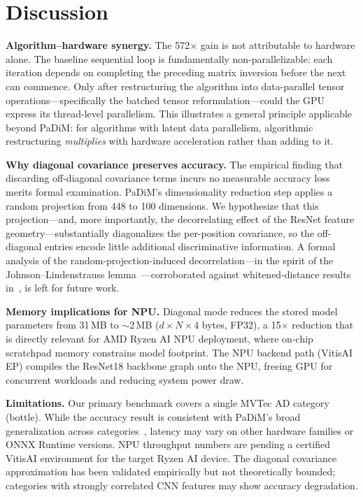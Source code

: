\documentclass[blind]{gtac}
\begin{document}
\section{Discussion}
\label{sec:discussion}

\textbf{Algorithm--hardware synergy.}
The 572$\times$ gain is not attributable to hardware alone.  The baseline sequential
loop is fundamentally non-parallelizable: each iteration depends on completing
the preceding matrix inversion before the next can commence.  Only after
restructuring the algorithm into data-parallel tensor operations---specifically
the batched tensor reformulation---could the GPU express its thread-level
parallelism.  This illustrates a general principle applicable beyond PaDiM:
for algorithms with latent data parallelism, algorithmic restructuring
\emph{multiplies} with hardware acceleration rather than adding to it.

\textbf{Why diagonal covariance preserves accuracy.}
The empirical finding that discarding off-diagonal covariance terms incurs no
measurable accuracy loss merits formal examination.  PaDiM's dimensionality reduction step applies
a random projection from 448 to 100 dimensions.  We hypothesize that this
projection---and, more importantly, the decorrelating effect of the ResNet
feature geometry---substantially diagonalizes the per-position covariance, so
the off-diagonal entries encode little additional discriminative information.
A formal analysis of the random-projection-induced decorrelation---in the spirit
of the Johnson--Lindenstrauss lemma~\cite{johnson1984extensions}---corroborated
against whitened-distance results in~\cite{roth2022towards}, is left for future work.

\textbf{Memory implications for NPU.}
Diagonal mode reduces the stored model parameters from 31\,MB to $\sim$2\,MB
($d \times N \times 4$ bytes, FP32), a 15$\times$ reduction that is directly
relevant for AMD Ryzen AI NPU deployment, where on-chip scratchpad memory
constrains model footprint.  The NPU backend path (VitisAI EP) compiles the
ResNet18 backbone graph onto the NPU, freeing GPU for concurrent workloads
and reducing system power draw.

\textbf{Limitations.}
Our primary benchmark covers a single MVTec AD category (bottle).  While the
accuracy result is consistent with PaDiM's broad generalization across
categories~\cite{defard2021padim}, latency may vary on other hardware families
or ONNX Runtime versions.  NPU throughput numbers are pending a certified
VitisAI environment for the target Ryzen AI device.  The diagonal covariance
approximation has been validated empirically but not theoretically bounded;
categories with strongly correlated CNN features may show accuracy degradation.
\end{document}
